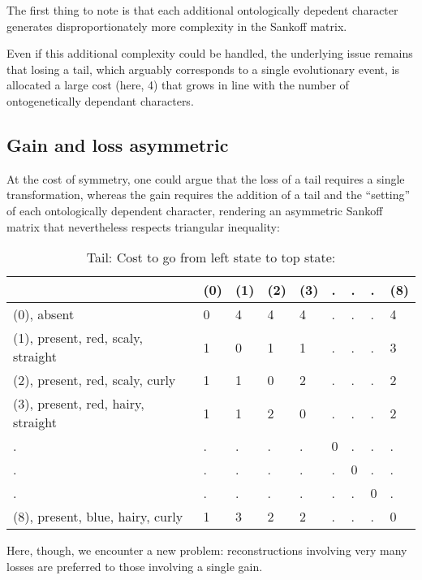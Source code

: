 \documentclass[]{book}
\theoremstyle{definition}
\theoremstyle{definition}
\theoremstyle{definition}
\theoremstyle{remark}
\begin{document}
The first thing to note is that each additional ontologically depedent
character generates disproportionately more complexity in the Sankoff
matrix.

Even if this additional complexity could be handled, the underlying
issue remains that losing a tail, which arguably corresponds to a single
evolutionary event, is allocated a large cost (here, 4) that grows in
line with the number of ontogenetically dependant characters.

\hypertarget{gain-and-loss-asymmetric}{%
\subsection{Gain and loss asymmetric}\label{gain-and-loss-asymmetric}}

At the cost of symmetry, one could argue that the loss of a tail
requires a single transformation, whereas the gain requires the addition
of a tail and the ``setting'' of each ontologically dependent character,
rendering an asymmetric Sankoff matrix that nevertheless respects
triangular inequality:

\begin{table}

\caption{\label{tab:unnamed-chunk-22}Tail: Cost to go from left state to top state:}
\centering
\begin{tabular}[t]{l|l|l|l|l|l|l|l|l}
\hline
  & (0) & (1) & (2) & (3) & . & . & . & (8)\\
\hline
(0), absent & 0 & 4 & 4 & 4 & . & . & . & 4\\
\hline
(1), present, red, scaly, straight & 1 & 0 & 1 & 1 & . & . & . & 3\\
\hline
(2), present, red, scaly, curly & 1 & 1 & 0 & 2 & . & . & . & 2\\
\hline
(3), present, red, hairy, straight & 1 & 1 & 2 & 0 & . & . & . & 2\\
\hline
. & . & . & . & . & 0 & . & . & .\\
\hline
. & . & . & . & . & . & 0 & . & .\\
\hline
. & . & . & . & . & . & . & 0 & .\\
\hline
(8), present, blue, hairy, curly & 1 & 3 & 2 & 2 & . & . & . & 0\\
\hline
\end{tabular}
\end{table}

Here, though, we encounter a new problem: reconstructions involving very
many losses are preferred to those involving a single gain.
\end{document}
